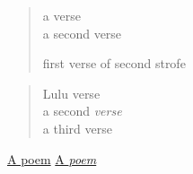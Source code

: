 \label{poem:1}
\begin{verse}
a verse \\
a second verse

first verse of second strofe

\end{verse}
\label{poem:2}
\begin{verse}
Lulu verse \\
a second \emph{verse} \\
a third verse

\end{verse}
\hyperref[poem:1]{A poem}
\hyperref[poem:2]{A \emph{poem}}

